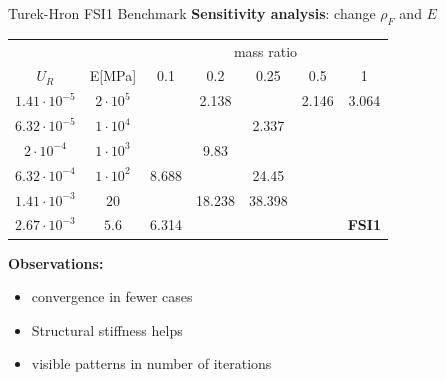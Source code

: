 \documentclass[10pt,t]{beamer}
\begin{document}
\begin{frame}{Turek-Hron FSI1 Benchmark}
\label{fsi1}
\textbf{Sensitivity analysis}: change $\rho_F$ and $E$ 


\footnotesize
\begin{center}
		\begin{tabular}{ c | c | c c c c c |} 
			&  & \multicolumn{5}{c|}{mass ratio} \\
			
			$U_R$ & E[\si{MPa}] & 0.1 & 0.2 & 0.25 & 0.5 & 1 \\
			\hline
			
			$1.41\cdot 10^{-5}$ & $2\cdot 10^{5}$ & \cellcolor{green!10} & \cellcolor{green!10}2.138 & \cellcolor{green!10} & \cellcolor{green!10}2.146 & \cellcolor{green!10}3.064 \\
			$6.32\cdot 10^{-5}$ & $1\cdot 10^{4}$ & \cellcolor{green!10} & \cellcolor{green!10} & \cellcolor{green!10}2.337 & \cellcolor{red!10} & \cellcolor{red!10} \\        
			$2\cdot 10^{-4}$ & $1\cdot 10^{3}$ & \cellcolor{green!10} & \cellcolor{green!10}9.83 & \cellcolor{yellow!10} & \cellcolor{red!10} & \cellcolor{red!10} \\
			$6.32\cdot 10^{-4}$ & $1\cdot 10^{2}$ & \cellcolor{green!10}8.688 & \cellcolor{green!10} & \cellcolor{yellow!10} 24.45 & \cellcolor{red!10} & \cellcolor{red!10} \\
			$1.41\cdot 10^{-3}$ & $20$ & \cellcolor{green!10} & \cellcolor{yellow!10}18.238 & \cellcolor{yellow!10}38.398 & \cellcolor{red!10} & \cellcolor{red!10} \\
			$2.67\cdot 10^{-3}$ & $5.6$ & \cellcolor{green!10}6.314 & \cellcolor{red!10} & \cellcolor{red!10} & \cellcolor{red!10} & \cellcolor{red!10}\textbf{FSI1} \\
			\hline                        
		\end{tabular}
\end{center}

\vspace{0.5cm}

\normalsize

\textbf{Observations:}
\begin{itemize}
    \item convergence in fewer cases
    \item Structural stiffness helps
    \item visible patterns in number of iterations
\end{itemize}


\end{frame}
\end{document}
